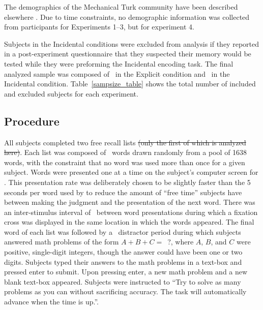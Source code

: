 \documentclass[man,natbib,floatsintext]{apa6} %
\begin{document}
\label{TODO-10} The demographics of the Mechanical Turk community have been described elsewhere \cite[approximately 55\% female with a mean age of 32;][]{MasoSuri12}. Due to time constraints, no demographic information was collected from participants for Experiments 1--3, but for experiment 4. 

Subjects in the Incidental conditions were excluded from analysis if they reported in a post-experiment questionnaire that they suspected their memory would be tested while they were preforming the Incidental encoding task. The final analyzed sample was composed of \shoeExplicitIncluded~in the Explicit condition and \shoeIncidentalIncluded~in the Incidental condition. Table~\ref{sampsize_table} shows the total number of included and excluded subjects for each experiment.

\subsection{Procedure}
All subjects completed two free recall lists \st{(only the first of which is analyzed here)}. Each list was composed of \listlength~words drawn randomly from a pool of 1638 words, with the constraint that no word was used more than once for a given subject. Words were presented one at a time on the subject's computer screen for \presrate. This presentation rate was deliberately chosen to be slightly faster than the 5 seconds per word used by \citet{NairEtal17} to reduce the amount of ``free time'' subjects have between making the judgment and the presentation of the next word.
There was an inter-stimulus interval of \isi~between word presentations during which a fixation cross was displayed in the same location in which the words appeared. The final word of each list was followed by a \DFRDelay~distractor period during which subjects answered math problems of the form $A+B+C=$~?, where $A$, $B$, and $C$ were positive, single-digit integers, though the answer could have been one or two digits. Subjects typed their answers to the math problems in a text-box and pressed enter to submit. Upon pressing enter, a new math problem and a new blank text-box appeared. Subjects were instructed to ``Try to solve as many problems as you can without sacrificing accuracy. The task will automatically advance when the time is up.''.
\end{document}

